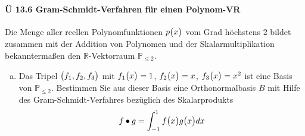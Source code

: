 \documentclass{scrreprt}
\begin{document}
\newpage
\paragraph{Ü 13.6 Gram-Schmidt-Verfahren für einen Polynom-VR}

Die Menge aller reellen Polynomfunktionen $p\qty\big(x)$ vom Grad höchstens 2
bildet zusammen mit der Addition von Polynomen und der Skalarmultiplikation
bekanntermaßen den $\mathbb{R}$-Vektorraum $\mathbb{P}_{\leq 2}$.
\begin{enumerate}[(a)]
\item Das Tripel $\qty\big(f_1, f_2, f_3)$ mit $f_1\qty\big(x) = 1$,
  $f_2\qty\big(x) = x$, $f_3\qty\big(x) = x^2$ ist eine Basis von
  $\mathbb{P}_{\leq 2}$.
  Bestimmen Sie aus dieser Basis eine Orthonormalbasis $B$ mit Hilfe des
  Gram-Schmidt-Verfahres bezüglich des Skalarprodukts
  \[
    f \bullet g = \int_{-1}^1 f\qty\big(x)g\qty\big(x)dx
  \]


\end{enumerate}
\end{document}
